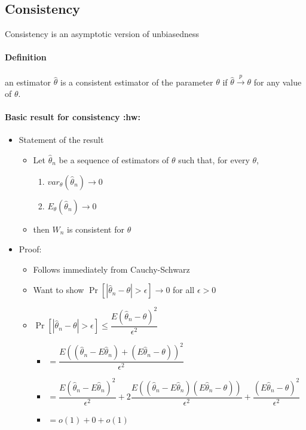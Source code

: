 \subsection{Consistency}
     Consistency is an asymptotic version of unbiasedness

\paragraph{Definition}
      an estimator $\hat \theta$ is a consistent estimator of the
      parameter $\theta$ if $\hat \theta \xrightarrow{p} \theta$ for
      any value of $\theta$.

\paragraph{Basic result for consistency \textbf{:hw:}}
\begin{itemize}
\item Statement of the result
\begin{itemize}
\item Let $\hat\theta_n$ be a sequence of estimators of $\theta$ such
          that, for every $\theta$,
\begin{enumerate}
\item $var_\theta(\hat\theta_n) \to 0$
\item $E_\theta (\hat\theta_n) \to 0$
\end{enumerate}
\item then $W_n$ is consistent for $\theta$
\end{itemize}
\item Proof:
\begin{itemize}
\item Follows immediately from Cauchy-Schwarz
\item Want to show $\Pr[|\hat \theta_n - \theta| > \epsilon] \to 0$ for all $\epsilon > 0$
\item $\Pr[|\hat \theta_n - \theta| > \epsilon] \leq \dfrac{E(\hat\theta_n - \theta)^2}{\epsilon^2}$
\begin{itemize}
\item $= \dfrac{E((\hat\theta_n - E\hat\theta_n)+ (E\hat\theta_n - \theta))^2}{\epsilon^2}$
\item $= \dfrac{E(\hat\theta_n - E\hat\theta_n)^2}{\epsilon^2} + 2 \dfrac{E((\hat\theta_n - E\hat\theta_n)(E\hat\theta_n - \theta))}{\epsilon^2} + \dfrac{(E\hat\theta_n - \theta)^2}{\epsilon^2}$
\item $= o(1) + 0 + o(1)$
\end{itemize}
\end{itemize}
\end{itemize}

